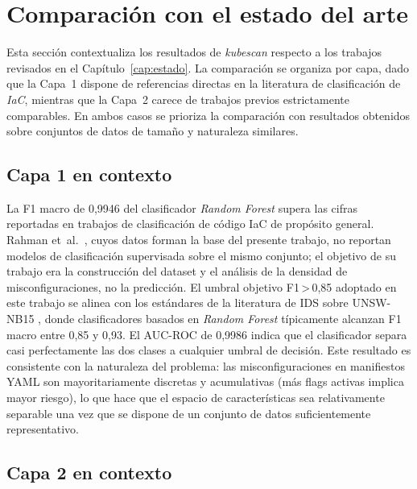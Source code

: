 \section{Comparación con el estado del arte}
\label{sec:comparacion}

Esta sección contextualiza los resultados de \textit{kubescan} respecto a los
trabajos revisados en el Capítulo~\ref{cap:estado}. La comparación se organiza
por capa, dado que la Capa~1 dispone de referencias directas en la literatura de
clasificación de \textit{IaC}, mientras que la Capa~2 carece de trabajos previos
estrictamente comparables. En ambos casos se prioriza la comparación con
resultados obtenidos sobre conjuntos de datos de tamaño y naturaleza similares.

\subsection{Capa 1 en contexto}

La F1 macro de 0,9946 del clasificador \textit{Random Forest} supera las cifras
reportadas en trabajos de clasificación de código \ac{IaC} de propósito general. Rahman
et~al.\ \citep{Rahman2022}, cuyos datos forman la base del presente trabajo, no
reportan modelos de clasificación supervisada sobre el mismo conjunto; el objetivo
de su trabajo era la construcción del dataset y el análisis de la densidad de
misconfiguraciones, no la predicción. El umbral objetivo F1\,>\,0,85 adoptado en
este trabajo se alinea con los estándares de la literatura de \acs{IDS} sobre UNSW-NB15
\citep{Moustafa2015}, donde clasificadores basados en \textit{Random Forest}
típicamente alcanzan F1 macro entre 0,85 y 0,93.
El \ac{AUC}-\ac{ROC} de 0,9986 indica que el clasificador separa casi perfectamente las dos
clases a cualquier umbral de decisión. Este resultado es consistente con la naturaleza
del problema: las misconfiguraciones en manifiestos \acs{YAML} son mayoritariamente discretas
y acumulativas (más flags activas implica mayor riesgo), lo que hace que el espacio de
características sea relativamente separable una vez que se dispone de un conjunto de
datos suficientemente representativo.

\subsection{Capa 2 en contexto}

